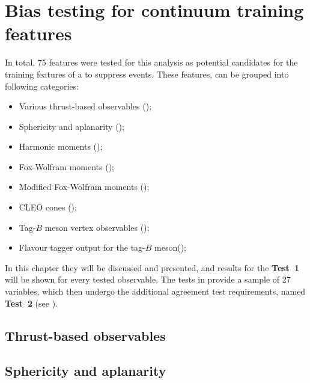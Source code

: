 \chapter{Bias testing for continuum \texorpdfstring{\BDT}{BDT} training features}\label{sec:appendix_continuum_features}

In total, 75 features were tested for this analysis as potential candidates for the training features of a \BDT to suppress \epem\ra\qqbar events.
These features, can be grouped into following categories:

\begin{itemize}
    \item Various thrust-based observables ();
    \item Sphericity and aplanarity ();
    \item Harmonic moments ();
    \item Fox-Wolfram moments ();
    \item Modified Fox-Wolfram moments ();
    \item CLEO cones ();
    \item Tag-$B$ meson vertex observables ();
    \item Flavour tagger output for the tag-$B$ meson();
\end{itemize}

In this chapter they will be discussed and presented, and results for the \textbf{Test~1} will be shown for every tested observable.
The tests in 
provide a sample of 27 variables, which then undergo the additional agreement test requirements, named \textbf{Test~2} (see ).

\section{Thrust-based observables}\label{sec:thrusts}

\newpage

\section{Sphericity and aplanarity}\label{sec:sphericity_aplanarity}

\newpage

